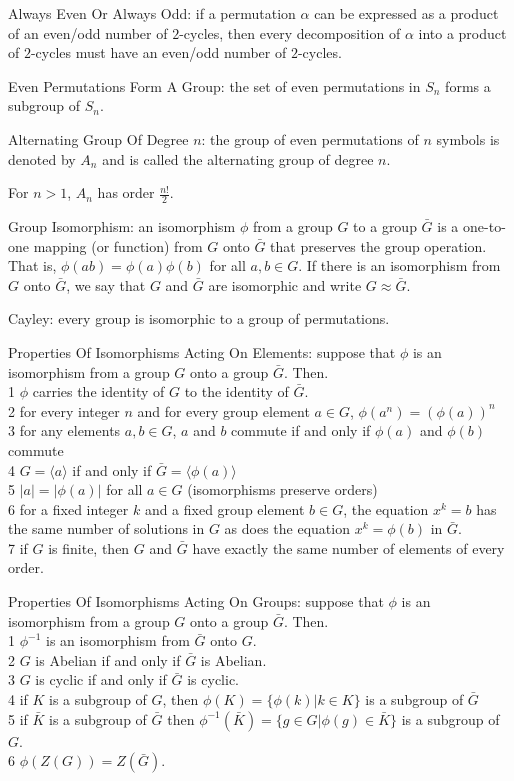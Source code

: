 Always Even Or Always Odd: if a permutation $\alpha$ can be expressed as a product of an even/odd number of $2$-cycles, then every decomposition of $\alpha$ into a product of $2$-cycles must have an even/odd number of $2$-cycles.

Even Permutations Form A Group: the set of even permutations in $S_n$ forms a subgroup of $S_n$.

Alternating Group Of Degree $n$: the group of even permutations of $n$ symbols is denoted by $A_n$ and is called the alternating group of degree $n$.

For $n>1$, $A_n$ has order $\frac{n!}{2}$.

Group Isomorphism: an isomorphism $\phi$ from a group $G$ to a group $\bar{G}$ is a one-to-one mapping (or function) from $G$ onto $\bar{G}$ that preserves the group operation. That is, $\phi (ab)=\phi (a) \phi (b)$ for all $a,b \in G$. If there is an isomorphism from $G$ onto $\bar{G}$, we say that $G$ and $\bar{G}$ are isomorphic and write $G \approx \bar{G}$.

Cayley: every group is isomorphic to a group of permutations.

Properties Of Isomorphisms Acting On Elements: suppose that $\phi$ is an isomorphism from a group $G$ onto a group $\bar{G}$. Then. \\
1 $\phi$ carries the identity of $G$ to the identity of $\bar{G}$. \\
2 for every integer $n$ and for every group element $a \in G$, $\phi (a^n) = (\phi (a))^n$\\
3 for any elements $a,b \in G$, $a$ and $b$ commute if and only if $\phi (a)$ and $\phi (b)$ commute\\
4 $G = \langle a \rangle$ if and only if $\bar{G} = \langle \phi (a) \rangle$\\
5 $|a|=|\phi (a)|$ for all $a \in G$ (isomorphisms preserve orders)\\
6 for a fixed integer $k$ and a fixed group element $b \in G$, the equation $x^k = b$ has the same number of solutions in $G$ as does the equation $x^k = \phi (b)$ in $\bar{G}$. \\
7 if $G$ is finite, then $G$ and $\bar{G}$ have exactly the same number of elements of every order.

Properties Of Isomorphisms Acting On Groups: suppose that $\phi$ is an isomorphism from a group $G$ onto a group $\bar{G}$. Then. \\
1 $\phi^{-1}$ is an isomorphism from $\bar{G}$ onto $G$. \\
2 $G$ is Abelian if and only if $\bar{G}$ is Abelian. \\
3 $G$ is cyclic if and only if $\bar{G}$ is cyclic. \\
4 if $K$ is a subgroup of $G$, then $\phi (K) = \{ \phi (k) | k \in K \}$ is a subgroup of $\bar{G}$\\
5 if $\bar{K}$ is a subgroup of $\bar{G}$ then $\phi^{-1} (\bar{K}) = \{g \in G | \phi (g) \in \bar{K} \}$ is a subgroup of $G$. \\
6 $\phi (Z(G)) = Z(\bar{G})$.

